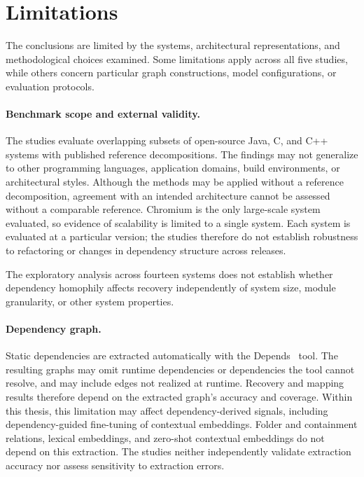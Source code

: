 \section{Limitations \label{sec:limitations}}

The conclusions are limited by the systems, architectural representations, and methodological choices examined. Some limitations apply across all five studies, while others concern particular graph constructions, model configurations, or evaluation protocols.

\paragraph{Benchmark scope and external validity.}
The studies evaluate overlapping subsets of open-source Java, C, and C++ systems with published reference decompositions. The findings may not generalize to other programming languages, application domains, build environments, or architectural styles. Although the methods may be applied without a reference decomposition, agreement with an intended architecture cannot be assessed without a comparable reference. Chromium is the only large-scale system evaluated, so evidence of scalability is limited to a single system. Each system is evaluated at a particular version; the studies therefore do not establish robustness to refactoring or changes in dependency structure across releases.

The exploratory analysis across fourteen systems does not establish whether dependency homophily affects recovery independently of system size, module granularity, or other system properties.

\paragraph{Dependency graph.}
Static dependencies are extracted automatically with the Depends~\cite{depends} tool. The resulting graphs may omit runtime dependencies or dependencies the tool cannot resolve, and may include edges not realized at runtime. Recovery and mapping results therefore depend on the extracted graph's accuracy and coverage. Within this thesis, this limitation may affect dependency-derived signals, including dependency-guided fine-tuning of contextual embeddings. Folder and containment relations, lexical embeddings, and zero-shot contextual embeddings do not depend on this extraction. The studies neither independently validate extraction accuracy nor assess sensitivity to extraction errors.

